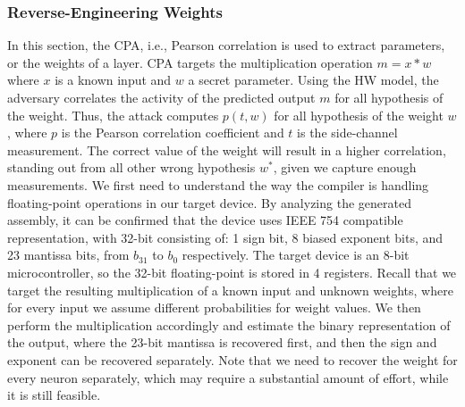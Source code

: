 \subsubsection{Reverse-Engineering Weights}
In this section, the CPA, i.e., Pearson correlation is used to extract parameters, or the weights of a layer.
CPA targets the multiplication operation $m=x*w$ where $x$ is a known input and $w$ a secret parameter.
Using the HW model, the adversary correlates the activity of the predicted output $m$ for all hypothesis of the weight.
Thus, the attack computes $p(t, w)$ for all hypothesis of the weight $w$, where $p$ is the Pearson correlation coefficient and $t$ is the side-channel measurement.
The correct value of the weight will result in a higher correlation, standing out from all other wrong hypothesis $w^*$, given we capture enough measurements.
We first need to understand the way the compiler is handling floating-point operations in our target device.
By analyzing the generated assembly, it can be confirmed that the device uses IEEE 754 compatible representation, with 32-bit consisting of: 1 sign bit, 8 biased exponent bits, and 23 mantissa bits, from $b_31$ to $b_0$ respectively.
The target device is an 8-bit microcontroller, so the 32-bit floating-point is stored in 4 registers.
Recall that we target the resulting multiplication of a known input and unknown weights, where for every input we assume different probabilities for weight values.
We then perform the multiplication accordingly and estimate the binary representation of the output, where the 23-bit mantissa is recovered first, and then the sign and exponent can be recovered separately.
Note that we need to recover the weight for every neuron separately, which may require a substantial amount of effort, while it is still feasible.

